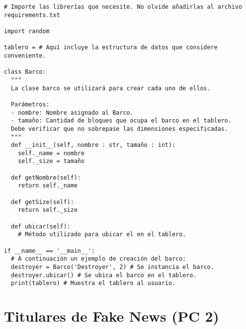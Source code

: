 \begin{verbatim}
# Importe las librerías que necesite. No olvide añadirlas al archivo
requirements.txt

import random

tablero = # Aquí incluye la estructura de datos que considere conveniente. 

class Barco:
  """
  La clase barco se utilizará para crear cada uno de ellos. 

  Parámetros:
  - nombre: Nombre asignado al Barco.
  - tamaño: Cantidad de bloques que ocupa el barco en el tablero. 
  Debe verificar que no sobrepase las dimensiones especificadas.
  """
  def __init__(self, nombre : str, tamaño : int):
    self._name = nombre
    self._size = tamaño
        
  def getNombre(self):
    return self._name

  def getSize(self):
    return self._size

  def ubicar(self):
    # Método utilizado para ubicar el en el tablero.

if __name__ == '__main__':
  # A continuación un ejemplo de creación del barco:
  destroyer = Barco('Destroyer', 2) # Se instancia el barco.
  destroyer.ubicar() # Se ubica el barco en el tablero.
  print(tablero) # Muestra el tablero al usuario.

\end{verbatim}

\newpage
\section{Titulares de Fake News (PC 2)}


